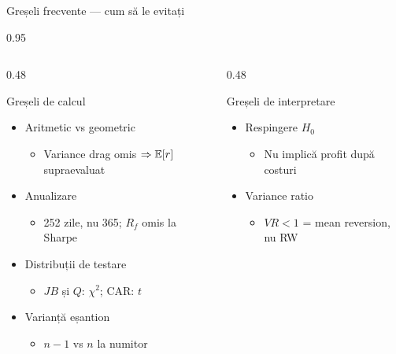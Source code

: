 \documentclass[9pt, aspectratio=169, t]{beamer}
\begin{document}
\begin{frame}{Greșeli frecvente --- cum să le evitați}
\begin{cminipage}{0.95\textwidth}
\begin{columns}[T]
\begin{column}{0.48\textwidth}
\begin{alertblock}{Greșeli de calcul}
\small
\begin{itemize}\setlength{\itemsep}{0pt}
    \item Aritmetic vs geometric
    \begin{itemize}\setlength{\itemsep}{0pt}
        \item Variance drag omis $\Rightarrow \mathbb{E}[r]$ supraevaluat
    \end{itemize}
    \item Anualizare
    \begin{itemize}\setlength{\itemsep}{0pt}
        \item 252 zile, nu 365; $R_f$ omis la Sharpe
    \end{itemize}
    \item Distribuții de testare
    \begin{itemize}\setlength{\itemsep}{0pt}
        \item $JB$ și $Q$: $\chi^2$; CAR: $t$
    \end{itemize}
    \item Varianță eșantion
    \begin{itemize}\setlength{\itemsep}{0pt}
        \item $n-1$ vs $n$ la numitor
    \end{itemize}
\end{itemize}
\end{alertblock}
\end{column}
\begin{column}{0.48\textwidth}
\begin{alertblock}{Greșeli de interpretare}
\small
\begin{itemize}\setlength{\itemsep}{0pt}
    \item Respingere $H_0$
    \begin{itemize}\setlength{\itemsep}{0pt}
        \item Nu implică profit după costuri
    \end{itemize}
    \item Variance ratio
    \begin{itemize}\setlength{\itemsep}{0pt}
        \item $VR < 1$ = mean reversion, nu RW

\end{itemize}
\end{itemize}
\end{alertblock}
\end{column}
\end{columns}
\end{cminipage}
\end{frame}
\end{document}
